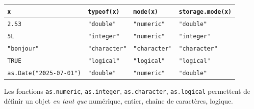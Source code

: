 \documentclass[
]{book}
\begin{document}
\begin{longtable}[]{@{}
  >{\centering\arraybackslash}p{}
  >{\centering\arraybackslash}p{}
  >{\centering\arraybackslash}p{}
  >{\centering\arraybackslash}p{}@{}}
\toprule\noalign{}
\begin{minipage}[b]{\linewidth}\centering
\texttt{x}
\end{minipage} & \begin{minipage}[b]{\linewidth}\centering
\texttt{typeof(x)}
\end{minipage} & \begin{minipage}[b]{\linewidth}\centering
\texttt{mode(x)}
\end{minipage} & \begin{minipage}[b]{\linewidth}\centering
\texttt{storage.mode(x)}
\end{minipage} \\
\midrule\noalign{}
\endhead
\bottomrule\noalign{}
\endlastfoot
\texttt{2.53} & \texttt{"double"} & \texttt{"numeric"} & \texttt{"double"} \\
\texttt{5L} & \texttt{"integer"} & \texttt{"numeric"} & \texttt{"integer"} \\
\texttt{"bonjour"} & \texttt{"character"} & \texttt{"character"} & \texttt{"character"} \\
\texttt{TRUE} & \texttt{"logical"} & \texttt{"logical"} & \texttt{"logical"} \\
\texttt{as.Date("2025-07-01")} & \texttt{"double"} & \texttt{"numeric"} & \texttt{"double"} \\
\end{longtable}

Les fonctions \texttt{as.numeric}, \texttt{as.integer}, \texttt{as.character}, \texttt{as.logical} permettent de définir un objet \emph{en tant que} numérique, entier, chaîne de caractères, logique.
\end{document}
